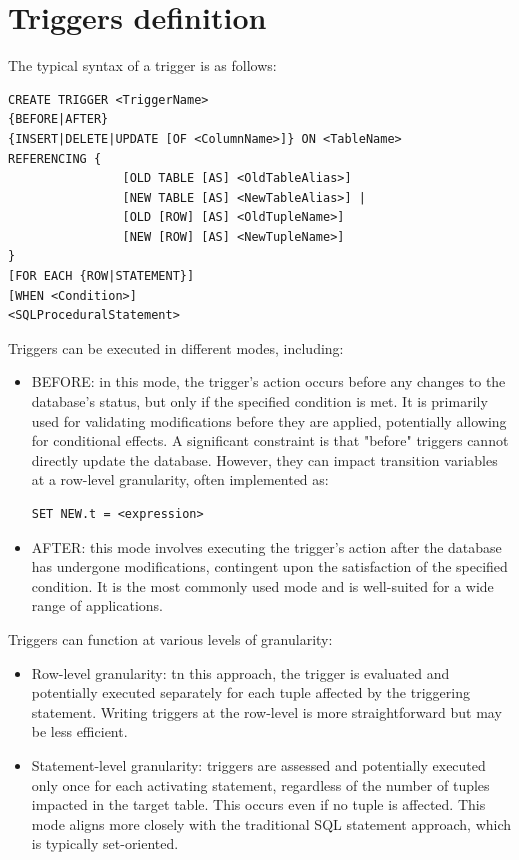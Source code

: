 \section{Triggers definition}

The typical syntax of a trigger is as follows:
\begin{lstlisting}[style=SQL]
CREATE TRIGGER <TriggerName>
{BEFORE|AFTER}
{INSERT|DELETE|UPDATE [OF <ColumnName>]} ON <TableName>
REFERENCING { 
                [OLD TABLE [AS] <OldTableAlias>]
                [NEW TABLE [AS] <NewTableAlias>] |
                [OLD [ROW] [AS] <OldTupleName>]
                [NEW [ROW] [AS] <NewTupleName>]
}
[FOR EACH {ROW|STATEMENT}]
[WHEN <Condition>]
<SQLProceduralStatement> 
\end{lstlisting}
Triggers can be executed in different modes, including:
\begin{itemize}
    \item BEFORE: in this mode, the trigger's action occurs before any changes to the database's status, but only if the specified condition is met.
        It is primarily used for validating modifications before they are applied, potentially allowing for conditional effects.
        A significant constraint is that "before" triggers cannot directly update the database. 
        However, they can impact transition variables at a row-level granularity, often implemented as: 
        \begin{lstlisting}[style=SQL]
SET NEW.t = <expression>
        \end{lstlisting}
    \item AFTER: this mode involves executing the trigger's action after the database has undergone modifications, contingent upon the satisfaction of the specified condition.
        It is the most commonly used mode and is well-suited for a wide range of applications.
\end{itemize}
Triggers can function at various levels of granularity:
\begin{itemize}
    \item Row-level granularity: tn this approach, the trigger is evaluated and potentially executed separately for each tuple affected by the triggering statement. 
        Writing triggers at the row-level is more straightforward but may be less efficient.
    \item Statement-level granularity: triggers are assessed and potentially executed only once for each activating statement, regardless of the number of tuples impacted in the target table. 
        This occurs even if no tuple is affected. 
        This mode aligns more closely with the traditional SQL statement approach, which is typically set-oriented.
\end{itemize}
